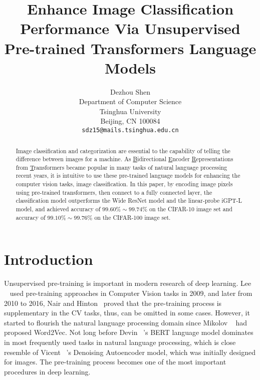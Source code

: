 \documentclass[review]{cvpr}
\begin{document}
\title{Enhance Image Classification Performance Via Unsupervised Pre-trained Transformers Language Models}

\author{Dezhou Shen\\
Department of Computer Science\\
Tsinghua University\\
Beijing, CN 100084\\
{\tt\small sdz15@mails.tsinghua.edu.cn}
}

\maketitle


\begin{abstract}

  Image classification and categorization are essential to the capability of telling the difference between images for a machine.
  As \underline{B}idirectional \underline{E}ncoder \underline{R}epresentations from \underline{T}ransformers became popular in many tasks of natural language processing recent years,
  it is intuitive to use these pre-trained language models for enhancing the computer vision tasks, \eg image classification.
  In this paper, by encoding image pixels using pre-trained transformers, then connect to a fully connected layer,
  the classification model outperforms the Wide ResNet model and the linear-probe iGPT-L model,
  and achieved accuracy of $99.60\%\sim99.74\%$ on the CIFAR-10 image set and accuracy of $99.10\%\sim99.76\%$ on the CIFAR-100 image set.

\end{abstract}

\section{Introduction}

  Unsupervised pre-training is important in modern research of deep learning.
  Lee \etal~\cite{lee2009convolutional} used pre-training approaches
  in Computer Vision tasks in 2009, and later from 2010 to 2016, Nair and Hinton~\cite{nair2010rectified} proved that the pre-training process is supplementary in the CV tasks,
  thus, can be omitted in some cases.
  However, it started to flourish the natural language processing domain since Mikolov \etal~\cite{mikolov2013distributed} had proposed Word2Vec.
  Not long before Devin \etal~\cite{devlin2019bert}'s BERT language model dominates in most frequently used tasks in natural language processing,
  which is close resemble of Vicent \etal~\cite{vincent2008extracting}'s Denoising Autoencoder model, which was initially designed for images.
  The pre-training process becomes one of the most important procedures in deep learning.
\end{document}
